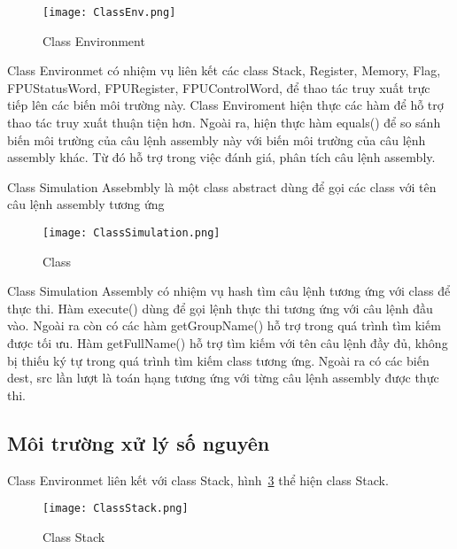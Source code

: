 	\newpage
		\begin{center}
			\begin{figure}[htp]
				\begin{center}
					\texttt{[image: ClassEnv.png]}
				\end{center}
				\caption{Class Environment}	
					\label{fig:ClassEnv}		
			\end{figure}
		\end{center}					
		
		Class Environmet có nhiệm vụ liên kết các class Stack, Register, Memory, Flag, FPUStatusWord, FPURegister, FPUControlWord, để thao tác truy xuất trực tiếp lên các biến môi trường này. Class Enviroment hiện thực các hàm để hỗ trợ thao tác truy xuất thuận tiện hơn. Ngoài ra, hiện thực hàm equals() để so sánh biến môi trường của câu lệnh assembly này với biến môi trường của câu lệnh assembly khác. Từ đó hỗ trợ trong việc đánh giá, phân tích câu lệnh assembly.
		
	\newpage
	Class Simulation Assebmbly là một class abstract dùng để gọi các class với tên câu lệnh assembly tương ứng	
	\begin{center}
			\begin{figure}[htp]
				\begin{center}
					\texttt{[image: ClassSimulation.png]}
				\end{center}
				\caption{Class}	
					\label{fig:}		
			\end{figure}
		\end{center}				
		
		Class Simulation Assembly có nhiệm vụ hash tìm câu lệnh tương ứng với class để thực thi. Hàm execute() dùng để gọi lệnh thực thi tương ứng với câu lệnh đầu vào. Ngoài ra còn có các hàm getGroupName() hỗ trợ trong quá trình tìm kiếm được tối ưu. Hàm getFullName() hỗ trợ tìm kiếm với tên câu lệnh đầy đủ, không bị thiếu ký tự trong quá trình tìm kiếm class tương ứng. Ngoài ra có các biến dest, src lần lượt là toán hạng tương ứng với từng câu lệnh assembly được thực thi. 
		
		\newpage
	\subsection*{Môi trường xử lý số nguyên}
	Class Environmet liên kết với class Stack, hình~\ref{fig:ClassStack} thể hiện class Stack.
		\begin{center}
			\begin{figure}[htp]
				\begin{center}
					\texttt{[image: ClassStack.png]}
				\end{center}
				\caption{Class Stack}	
					\label{fig:ClassStack}		
			\end{figure}
		\end{center}		
	
